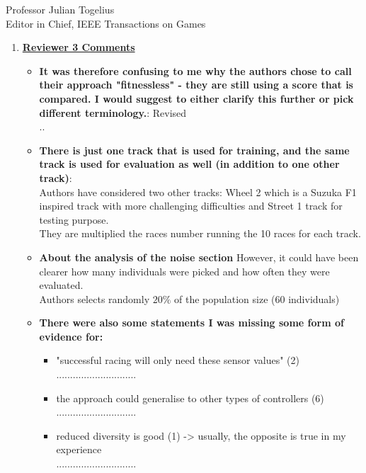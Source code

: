 \documentclass[10pt]{letter} %
\begin{document}
\begin{letter}{Professor Julian Togelius \\ Editor in Chief, IEEE Transactions on Games}
\begin{enumerate}
\item {\bf \underline{ Reviewer 3 Comments}}\\
	\begin{itemize}
	\item {\bf It was therefore confusing to me why the authors chose to call their approach "fitnessless" - they are still using a score that is compared. I would suggest to either clarify this further or pick different terminology.}: Revised\\
..
		\item {\bf	There is just one track that is used for training, and the same track is used for evaluation as well (in addition to one other track)}:\\
		Authors have considered two other tracks: Wheel 2 which is a Suzuka F1 inspired track with more challenging difficulties and Street 1 track for testing purpose.\\
		They are multiplied the races number running the  10 races for each track.
		\item {\bf	About the analysis of the noise section} However, it could have been clearer how many individuals were picked and how often they were evaluated.\\
		Authors selects randomly $20\%$ of the population size (60 individuals)
	
		\item {\bf There were also some statements I was missing some form of evidence for:}
			\begin{itemize}
			\item	"successful racing will only need these sensor values" (2)\\
.............................
			\item	the approach could generalise to other types of controllers (6)\\
.............................
			\item	reduced diversity is good (1) -> usually, the opposite is true in my experience\\
.............................
			\end{itemize}


\end{itemize}
\end{enumerate}
\end{letter}
\end{document}
